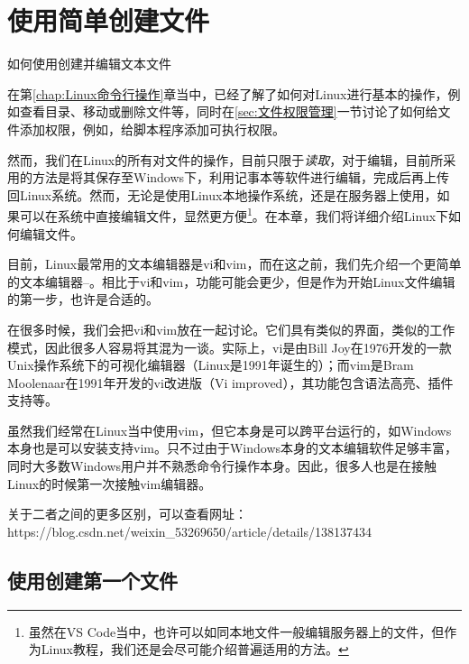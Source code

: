 \section{使用简单创建文件}\label{sec:使用nano简单创建文件}

\begin{Abstract}
    \item 如何使用创建并编辑文本文件
\end{Abstract}

在第\ref{chap:Linux命令行操作}章当中，已经了解了如何对Linux进行基本的操作，例如查看目录、移动或删除文件等，同时在\ref{sec:文件权限管理}一节讨论了如何给文件添加权限，例如，给脚本程序添加可执行权限。

然而，我们在Linux的所有对文件的操作，目前只限于\emph{读取}，对于编辑，目前所采用的方法是将其保存至Windows下，利用记事本等软件进行编辑，完成后再上传回Linux系统。然而，无论是使用Linux本地操作系统，还是在服务器上使用，如果可以在系统中直接编辑文件，显然更方便\footnote{虽然在VS Code当中，也许可以如同本地文件一般编辑服务器上的文件，但作为Linux教程，我们还是会尽可能介绍普遍适用的方法。}。在本章，我们将详细介绍Linux下如何编辑文件。

目前，Linux最常用的文本编辑器是vi和vim，而在这之前，我们先介绍一个更简单的文本编辑器--。相比于vi和vim，功能可能会更少，但是作为开始Linux文件编辑的第一步，也许是合适的。

\begin{extend}
    在很多时候，我们会把vi和vim放在一起讨论。它们具有类似的界面，类似的工作模式，因此很多人容易将其混为一谈。实际上，vi是由Bill Joy在1976开发的一款Unix操作系统下的可视化编辑器（Linux是1991年诞生的）；而vim是Bram Moolenaar在1991年开发的vi改进版（Vi improved），其功能包含语法高亮、插件支持等。

    虽然我们经常在Linux当中使用vim，但它本身是可以跨平台运行的，如Windows本身也是可以安装支持vim。只不过由于Windows本身的文本编辑软件足够丰富，同时大多数Windows用户并不熟悉命令行操作本身。因此，很多人也是在接触Linux的时候第一次接触vim编辑器。

    关于二者之间的更多区别，可以查看网址：\\https://blog.csdn.net/weixin\_53269650/article/details/138137434
\end{extend}

\subsection{使用创建第一个文件}\label{subsec:使用nano简单创建文件-使用nano创建第一个文件}

